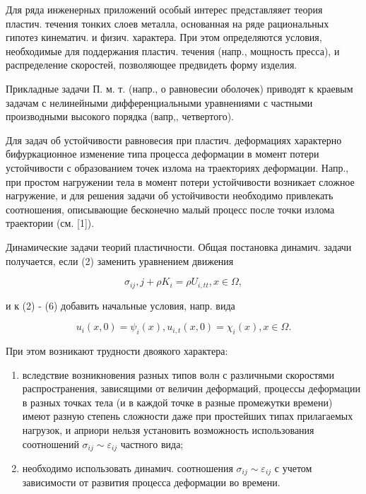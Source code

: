 \documentclass[10pt]{article}
\begin{document}
Для ряда инженерных приложений особый интерес представляяет теория пластич. течения тонких слоев металла, основанная на ряде рациональных гипотез кинематич. и физич. характера. При этом определяются условия, необходимые для поддержания пластич. течения (напр., мощность пресса), и распределение скоростей, позволяющее предвидеть форму изделия.



Прикладные задачи П. м. т. (напр., о равновесии оболочек) приводят к краевым задачам с нелинейными дифференциальными уравнениями с частными производными высокого порядка (вапр,, четвертого).



Для задач об устойчивости равновесия при пластич. деформациях характерно бифуркационное изменение типа процесса деформации в момент потери устойчивости с образованием точек излома на траекториях деформации. Напр., при простом нагружении тела в момент потери устойчивости возникает сложное нагружение, и для решения задачи об устойчивости необходимо привлекать соотношения, описывающие бесконечно малый процесс после точки излома траектории (см. [1]).



Динамические задачи теорий пластичности. Общая постановка динамич. задачи получается, если (2) заменить уравнением движения



\[

\sigma_{i j}, j+\rho K_{i}=\rho U_{i, t t}, x \in \Omega,

\]



и к (2) - (6) добавить начальные условия, напр. вида



\[

u_{i}(x, 0)=\psi_{i}(x), u_{i, t}(x, 0)=\chi_{i}(x), x \in \Omega .

\]



При этом возникают трудности двоякого характера:



\begin{enumerate}

  \item вследствие возникновения разных типов волн с различными скоростями распространения, зависящими от величин деформаций, процессы деформации в разных точках тела (и в каждой точке в разные промежутки времени) имеют разную степень сложности даже при простейших типах прилагаемых нагрузок, и априори нельзя установить возможность использования соотношений $\sigma_{i j} \sim \varepsilon_{i j}$ частного вида;



  \item необходимо использовать динамич. соотношения $\sigma_{i j} \sim \varepsilon_{i j}$ с учетом зависимости от развития процесса деформации во времени.



\end{enumerate}
\end{document}
